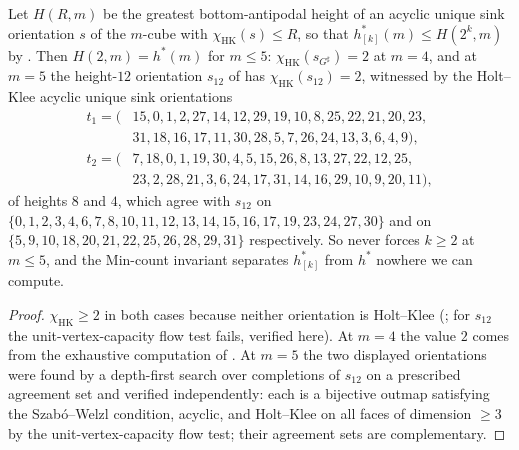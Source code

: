 \begin{proposition}\label{mb:chi-two}
Let $H(R,m)$ be the greatest bottom-antipodal height of an acyclic unique
sink orientation $s$ of the $m$-cube with $\chi_{\mathrm{HK}}(s)\le R$, so
that $h^{\ast}_{[k]}(m)\le H(2^{k},m)$ by . Then
$H(2,m)=h^{\ast}(m)$ for $m\le5$: $\chi_{\mathrm{HK}}(s_{G^{\sharp}})=2$
at $m=4$, and at $m=5$ the height-$12$ orientation $s_{12}$ of
 has $\chi_{\mathrm{HK}}(s_{12})=2$, witnessed by
the Holt--Klee acyclic unique sink orientations
\[
\begin{aligned}
 t_1=(&15,0,1,2,27,14,12,29,19,10,8,25,22,21,20,23,\\
      &31,18,16,17,11,30,28,5,7,26,24,13,3,6,4,9),\\
 t_2=(&7,18,0,1,19,30,4,5,15,26,8,13,27,22,12,25,\\
      &23,2,28,21,3,6,24,17,31,14,16,29,10,9,20,11),
\end{aligned}
\]
of heights $8$ and $4$, which agree with $s_{12}$ on
$\{0,1,2,3,4,6,7,8,10,11,12,13,14,15,16,17,19,23,24,27,30\}$ and on
$\{5,9,10,18,20,21,22,25,26,28,29,31\}$ respectively. So
 never forces $k\ge2$ at $m\le5$, and the Min-count
invariant separates $h^{\ast}_{[k]}$ from $h^{\ast}$ nowhere we can
compute.
\end{proposition}

\begin{proof}
$\chi_{\mathrm{HK}}\ge2$ in both cases because neither orientation is
Holt--Klee (; for $s_{12}$ the
unit-vertex-capacity flow test fails, verified here). At $m=4$ the value
$2$ comes from the exhaustive computation of . At $m=5$ the
two displayed orientations were found by a depth-first search over
completions of $s_{12}$ on a prescribed agreement set and verified
independently: each is a bijective outmap satisfying the Szab\'o--Welzl
condition, acyclic, and Holt--Klee on all faces of dimension
$\ge3$ by the unit-vertex-capacity flow test; their agreement sets are
complementary.
\end{proof}

